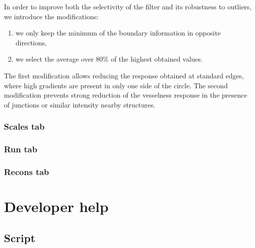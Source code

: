 \documentclass{article}
\begin{document}
In order to improve both the selectivity of the filter and its robustness to outliers, we introduce the modifications:
\begin{enumerate}
  \item we only keep the minimum of the boundary information in opposite directions,
  \item we select the average over $80\%$ of the highest obtained values.
\end{enumerate}
The first modification allows reducing the response obtained at standard edges, where high gradients are present in only one side of the circle. The second modification prevents strong reduction of the vesselness response in the presence of junctions or similar intensity nearby structures.

\subsubsection{Scales tab}
\subsubsection{Run tab}
\subsubsection{Recons tab}

\section{Developer help}

\subsection{Script}
\end{document}
